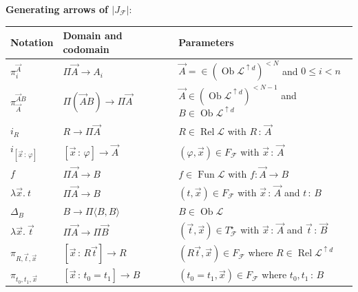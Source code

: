 \documentclass{amsart}
\newcommand\abs[2][]{#1\lvert{#2}#1\rvert}
\newcommand\br[1]{\langle{}#1\rangle{}}
\newcommand\cF{\mathcal{F}}
\newcommand\cL{\mathcal{L}}
\newcommand\Fun{\operatorname{Fun}}
\newcommand\Ob{\operatorname{Ob}}
\renewcommand\phi{\varphi}
\newcommand\Rel{\operatorname{Rel}}
\newcommand\tolon{{\,:\,}}
\newcommand\up{\uparrow}
\newcommand\vA{\vek{A}}
\newcommand\vB{\vek{B}}
\newcommand\vek[1]{{\vec{#1}}}
\newcommand\vt{\vek{t}}
\newcommand\vx{\vek{x}}
\theoremstyle{definition}
\theoremstyle{remark}
\theoremstyle{plainwithref}
\begin{document}
\begin{defn}
  \noindent
  \textbf{Generating arrows of \( \abs{J_{\cF}} \)}:
  \begin{center}
    \begin{tabular}{l|l|l}
      Notation & Domain and codomain & Parameters \\
      \hline
      \( \pi_i^{\vA} \) & \( \Pi \vA \to A_i \) & \( \vA = \in (\Ob \cL^{\up d})^{< N} \) and \( 0 \le i < n \) \\
      \( \pi_{\vA}^{\vA B} \) & \( \Pi (\vA B) \to \Pi \vA \) & \( \vA \in (\Ob \cL^{\up d})^{< N - 1} \) and \( B \in \Ob \cL^{\up d} \) \\
      \( i_R \) & \( R \to \Pi \vA \) & \( R \in \Rel \cL \) with \( R \tolon \vA \) \\
      \( i_{[ \vx \tolon \phi ]} \) & \([\vx \tolon \phi] \to \vA \) & \( (\phi, \vx) \in F_\cF \) with \( \vx \tolon \vA \) \\
      \( f \) & \( \Pi \vA \to B \) & \( f \in \Fun \cL \) with \( f \colon \vA \to B \) \\
      \( \lambda \vx.\ t \) & \( \Pi \vA \to B \) & \( (t, \vx) \in F_\cF \) with \( \vx \tolon \vA \) and \( t \tolon B \) \\
      \( \Delta_B \) & \( B \to \Pi \br{B, B} \) & \( B \in \Ob \cL \) \\
      \( \lambda \vx .\ \vt \) & \( \Pi \vA \to \Pi \vB \) & \( (\vt, \vx) \in T_\cF^\star \) with \( \vx \tolon \vA \) and \( \vt \tolon \vB \) \\
      \( \pi_{R, \vt, \vx} \) & \( [\vx \tolon R \vt] \to R \) & \( (R \vt, \vx) \in F_\cF \) where \( R \in \Rel \cL^{\up d} \) \\
      \( \pi_{t_0, t_1, \vx} \) & \( [ \vx \tolon t_0 = t_1] \to B \) & \( (t_0 = t_1, \vx) \in F_\cF \) where \( t_0, t_1 \tolon B \)
    \end{tabular}
  \end{center}


\end{defn}
\end{document}
